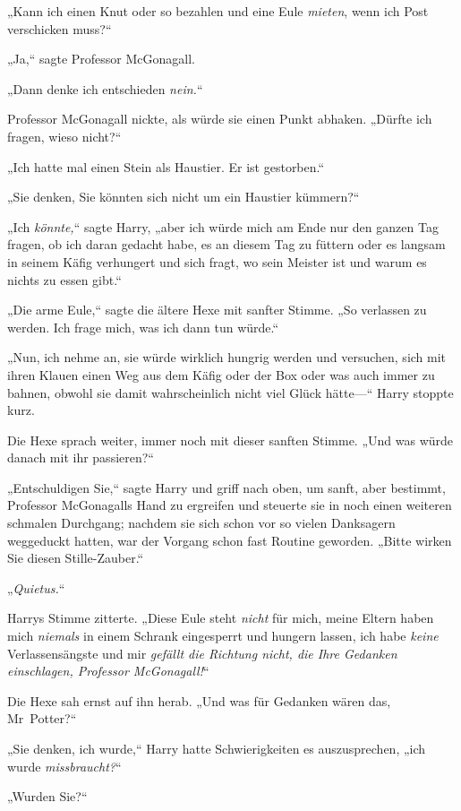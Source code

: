 {„Kann ich einen Knut oder so bezahlen und eine Eule \emph{mieten}, wenn ich Post verschicken muss?“

„Ja,“ sagte Professor McGonagall.

„Dann denke ich entschieden \emph{nein.}“

Professor McGonagall nickte, als würde sie einen Punkt abhaken. „Dürfte ich fragen, wieso nicht?“

„Ich hatte mal einen Stein als Haustier. Er ist gestorben.“

„Sie denken, Sie könnten sich nicht um ein Haustier kümmern?“

„Ich \emph{könnte,}“ sagte Harry, „aber ich würde mich am Ende nur den ganzen Tag fragen, ob ich daran gedacht habe, es an diesem Tag zu füttern oder es langsam in seinem Käfig verhungert und sich fragt, wo sein Meister ist und warum es nichts zu essen gibt.“

„Die arme Eule,“ sagte die ältere Hexe mit sanfter Stimme. „So verlassen zu werden. Ich frage mich, was ich dann tun würde.“

„Nun, ich nehme an, sie würde wirklich hungrig werden und versuchen, sich mit ihren Klauen einen Weg aus dem Käfig oder der Box oder was auch immer zu bahnen, obwohl sie damit wahrscheinlich nicht viel Glück hätte—“ Harry stoppte kurz.

Die Hexe sprach weiter, immer noch mit dieser sanften Stimme. „Und was würde danach mit ihr passieren?“

„Entschuldigen Sie,“ sagte Harry und griff nach oben, um sanft, aber bestimmt, Professor McGonagalls Hand zu ergreifen und steuerte sie in noch einen weiteren schmalen Durchgang; nachdem sie sich schon vor so vielen Danksagern weggeduckt hatten, war der Vorgang schon fast Routine geworden. „Bitte wirken Sie diesen Stille-Zauber.“

„\emph{Quietus.}“

Harrys Stimme zitterte. „Diese Eule steht \emph{nicht} für mich, meine Eltern haben mich \emph{niemals} in einem Schrank eingesperrt und hungern lassen, ich habe \emph{keine} Verlassensängste und mir \emph{gefällt die Richtung nicht, die Ihre Gedanken einschlagen, Professor McGonagall!}“

Die Hexe sah ernst auf ihn herab. „Und was für Gedanken wären das, Mr~Potter?“

„Sie denken, ich wurde,“ Harry hatte Schwierigkeiten es auszusprechen, „ich wurde \emph{missbraucht?}“

„Wurden Sie?“

}
